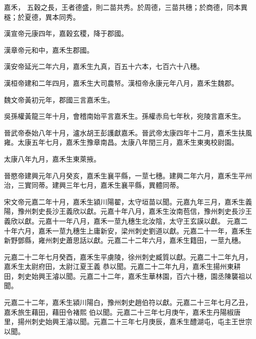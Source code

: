 
\begin{pinyinscope}

 嘉禾，
 五穀之長，王者德盛，則二苗共秀。於周德，三苗共穗；於商德，同本異穟；於夏德，異本同秀。



 漢宣帝元康四年，嘉穀玄稷，降于郡國。



 漢章帝元和中，嘉禾生郡國。



 漢安帝延光二年六月，嘉禾生九真，百五十六本，七百六十八穗。



 漢桓帝建和二年四月，嘉禾生大司農帑。漢桓帝永康元年八月，嘉禾生魏郡。



 魏文帝黃初元年，郡國三言嘉禾生。



 吳孫權黃龍三年十月，會稽南始平言嘉禾生。孫權赤烏七年秋，宛陵言嘉禾生。



 晉武帝泰始八年十月，瀘水胡王彭護獻嘉禾。晉武帝太康四年十二月，嘉禾生扶風雍。太康五年七月，嘉禾生豫章南昌。太康八年閏三月，嘉禾生東夷校尉園。



 太康八年九月，嘉禾生東萊掖。



 晉愍帝建興元年八月癸亥，嘉禾生襄平縣，一莖七穗。建興二年六月，嘉禾生平州治，三實同蒂。建興三年七月，嘉禾生襄平縣，異體同蒂。



 宋文帝元嘉二年十月，嘉禾生潁川陽翟，太守垣苗以聞。元嘉九年三月，嘉禾生義陽，豫州刺史長沙王義欣以獻。元嘉十年八月，嘉禾生汝南苞信，豫州刺史長沙王義欣以獻。元嘉十一年八月，嘉禾一莖九穗生北汝陰，太守王玄謨以獻。
 元嘉二十年六月，嘉禾一莖九穗生上庸新安，梁州刺史劉道以獻。元嘉二十一年，嘉禾生新野鄧縣，雍州刺史蕭思話以獻。元嘉二十二年六月，嘉禾生籍田，一莖九穗。



 元嘉二十二年七月癸酉，嘉禾生平虜陵，徐州刺史臧質以獻。元嘉二十二年九月，嘉禾生太尉府田，太尉江夏王義
 恭以聞。元嘉二十二年九月，嘉禾生揚州東耕田，刺史始興王濬以聞。元嘉二十二年，嘉禾生華林園，百六十穗，園丞陳襲祖以聞。



 元嘉二十二年，嘉禾生潁川陽白，豫州刺史趙伯符以獻。元嘉二十三年七月乙丑，嘉禾旅生藉田，藉田令褚熙
 伯以聞。元嘉二十三年七月庚午，嘉禾生丹陽椒唐里，揚州刺史始興王濬以聞。元嘉二十三年七月庚辰，嘉禾生醴湖屯，屯主王世宗以聞。




\end{pinyinscope}
